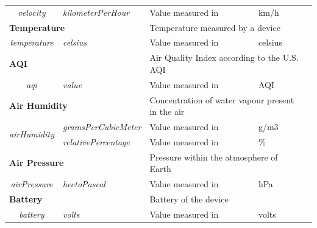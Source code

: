 \begin{landscape}
\begin{longtable}{cllll}
   \textit{velocity}                     & \textit{kilometerPerHour}          & Value measured in                                      & km/h                           &  \\ \cline{1-4}
   \multicolumn{2}{l}{\textbf{Temperature}}                                   & \multicolumn{2}{l}{Temperature measured by a device}                                    &  \\
   \textit{temperature}                  & \textit{celsius}                   & Value measured in                                      & celsius                        &  \\ \cline{1-4}
   \multicolumn{2}{l}{\textbf{AQI}}                                           & \multicolumn{2}{l}{Air Quality Index according to the U.S. AQI}                         &  \\
   \textit{aqi}                          & \textit{value}                     & Value measured in                                      & AQI                            &  \\ \cline{1-4}
   \multicolumn{2}{l}{\textbf{Air Humidity}}                                  & \multicolumn{2}{l}{Concentration of water vapour present in the air}                    &  \\
   \multirow{2}{*}{\textit{airHumidity}} & \textit{gramsPerCubicMeter}        & Value measured in                                      & g/m3                           &  \\
                                         & \textit{relativePercentage}        & Value measured in                                      & \%                             &  \\ \cline{1-4}
   \multicolumn{2}{l}{\textbf{Air Pressure}}                                  & \multicolumn{2}{l}{Pressure within the atmosphere of Earth}                             &  \\
   \textit{airPressure}                  & \textit{hectoPascal}               & Value measured in                                      & hPa                            &  \\ \cline{1-4}
   \multicolumn{2}{l}{\textbf{Battery}}                                       & \multicolumn{2}{l}{Battery of the device}                                               &  \\
   \multirow{4}{*}{\textit{battery}}     & \textit{volts}                     & Value measured in                                      & volts                          &  \\

\end{longtable}
\end{landscape}

